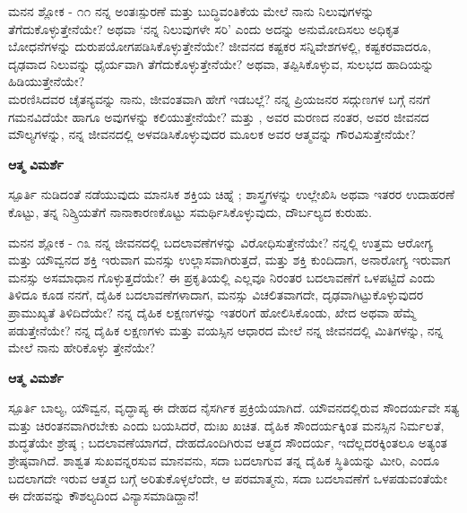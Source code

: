 \newpage
\begin{mananam}{\mananamfont ಮನನ ಶ್ಲೋಕ - ೧೧}
\footnotesize \mananamtext ನನ್ನ ಅಂತಃಸ್ಪುರಣೆ ಮತ್ತು ಬುದ್ಧಿವಂತಿಕೆಯ ಮೇಲೆ ನಾನು ನಿಲುವುಗಳನ್ನು ತೆಗೆದುಕೊಳ್ಳುತ್ತೇನೆಯೇ? ಅಥವಾ ‘ನನ್ನ ನಿಲುವುಗಳೇ ಸರಿ’ ಎಂದು ಅದನ್ನು ಅನುಮೋದಿಸಲು ಅಧಿಕೃತ ಬೋಧನೆಗಳನ್ನು ದುರುಪಯೋಗಪಡಿಸಿಕೊಳ್ಳುತ್ತೇನೆಯೇ? ಜೀವನದ ಕಷ್ಟಕರ ಸನ್ನಿವೇಶಗಳಲ್ಲಿ, ಕಷ್ಟಕರವಾದರೂ, ದೃಢವಾದ ನಿಲುವನ್ನು ಧೈರ್ಯವಾಗಿ ತೆಗೆದುಕೊಳ್ಳುತ್ತೇನೆಯೇ? ಅಥವಾ, ತಪ್ಪಿಸಿಕೊಳ್ಳುವ, ಸುಲಭದ ಹಾದಿಯನ್ನು ಹಿಡಿಯುತ್ತೇನೆಯೇ?\\
ಮರಣಿಸಿದವರ ಚೈತನ್ಯವನ್ನು ನಾನು, ಜೀವಂತವಾಗಿ ಹೇಗೆ ಇಡಬಲ್ಲೆ? ನನ್ನ ಪ್ರಿಯಜನರ ಸದ್ಗುಣಗಳ ಬಗ್ಗೆ ನನಗೆ ಗಮನವಿದೆಯೇ ಹಾಗೂ ಅವುಗಳನ್ನು ಕಲಿಯುತ್ತೇನೆಯೇ? ಮತ್ತು , ಅವರ ಮರಣದ ನಂತರ, ಅವರ ಜೀವನದ ಮೌಲ್ಯಗಳನ್ನು, ನನ್ನ ಜೀವನದಲ್ಲಿ ಅಳವಡಿಸಿಕೊಳ್ಳುವುದರ ಮೂಲಕ ಅವರ ಆತ್ಮವನ್ನು ಗೌರವಿಸುತ್ತೇನೆಯೇ?
\end{mananam}
\WritingHand\enspace\textbf{ಆತ್ಮ ವಿಮರ್ಶೆ}
\begin{inspiration}{\mananamfont ಸ್ಪೂರ್ತಿ}
\footnotesize \mananamtext ನುಡಿದಂತೆ ನಡೆಯುವುದು ಮಾನಸಿಕ ಶಕ್ತಿಯ ಚಿಹ್ನೆ ; ಶಾಸ್ತ್ರಗಳನ್ನು ಉಲ್ಲೇಖಿಸಿ ಅಥವಾ ಇತರರ ಉದಾಹರಣೆ ಕೊಟ್ಟು, ತನ್ನ ನಿಶ್ಕ್ರಿಯತೆಗೆ ನಾನಾಕಾರಣಕೊಟ್ಟು ಸಮರ್ಥಿಸಿಕೊಳ್ಳುವುದು, ದೌರ್ಬಲ್ಯದ ಕುರುಹು.
\end{inspiration}
\newpage

\begin{mananam}{\mananamfont ಮನನ ಶ್ಲೋಕ - ೧೩}
\footnotesize \mananamtext ನನ್ನ ಜೀವನದಲ್ಲಿ ಬದಲಾವಣೆಗಳನ್ನು ವಿರೋಧಿಸುತ್ತೇನೆಯೇ? ನನ್ನಲ್ಲಿ ಉತ್ತಮ ಆರೋಗ್ಯ ಮತ್ತು ಯೌವ್ವನದ ಶಕ್ತಿ ಇರುವಾಗ ಮನಸ್ಸು ಉಲ್ಲಾಸವಾಗಿರುತ್ತದೆ, ಮತ್ತು ಶಕ್ತಿ ಕುಂದಿದಾಗ, ಅನಾರೋಗ್ಯ ಇರುವಾಗ ಮನಸ್ಸು ಅಸಮಾಧಾನ ಗೊಳ್ಳುತ್ತದೆಯೇ? ಈ ಪ್ರಕೃತಿಯಲ್ಲಿ ಎಲ್ಲವೂ ನಿರಂತರ ಬದಲಾವಣೆಗೆ ಒಳಪಟ್ಟಿದೆ ಎಂದು ತಿಳಿದೂ ಕೂಡ ನನಗೆ, ದೈಹಿಕ ಬದಲಾವಣೆಗಳಾದಾಗ, ಮನಸ್ಸು ವಿಚಲಿತವಾಗದೇ, ದೃಢವಾಗಿಟ್ಟುಕೊಳ್ಳುವುದರ ಪ್ರಾಮುಖ್ಯತೆ ತಿಳಿದಿದೆಯೇ? ನನ್ನ ದೈಹಿಕ ಲಕ್ಷಣಗಳನ್ನು ಇತರರಿಗೆ ಹೋಲಿಸಿಕೊಂಡು, ಖೇದ ಅಥವಾ ಹೆಮ್ಮೆ ಪಡುತ್ತೇನೆಯೇ? ನನ್ನ ದೈಹಿಕ ಲಕ್ಷಣಗಳು ಮತ್ತು ವಯಸ್ಸಿನ ಆಧಾರದ ಮೇಲೆ ನನ್ನ ಜೀವನದಲ್ಲಿ ಮಿತಿಗಳನ್ನು, ನನ್ನ ಮೇಲೆ ನಾನು ಹೇರಿಕೊಳ್ಳು ತ್ತೇನೆಯೇ?
\end{mananam}
\WritingHand\enspace\textbf{ಆತ್ಮ ವಿಮರ್ಶೆ}
\begin{inspiration}{\mananamfont ಸ್ಪೂರ್ತಿ}
\footnotesize \mananamtext ಬಾಲ್ಯ, ಯೌವ್ವನ, ವೃದ್ಧಾಪ್ಯ ಈ ದೇಹದ ನೈಸರ್ಗಿಕ ಪ್ರಕ್ರಿಯೆಯಾಗಿದೆ. ಯೌವನದಲ್ಲಿರುವ ಸೌಂದರ್ಯವೇ ಸತ್ಯ ಮತ್ತು ಚಿರಂತನವಾಗಿರಬೇಕು ಎಂದು ಬಯಸಿದರೆ, ದುಃಖ ಖಚಿತ. ದೈಹಿಕ ಸೌಂದರ್ಯಕ್ಕಿಂತ ಮನಸ್ಸಿನ ನಿರ್ಮಲತೆ, ಶುದ್ಧತೆಯೇ ಶ್ರೇಷ್ಠ ; ಬದಲಾವಣೆಯಾಗದೆ, ದೇಹದೊಂದಿಗಿರುವ ಆತ್ಮದ ಸೌಂದರ್ಯ, ಇದೆಲ್ಲದರಕ್ಕಿಂತಲೂ  ಅತ್ಯಂತ ಶ್ರೇಷ್ಠವಾಗಿದೆ.
 ಶಾಶ್ವತ ಸುಖವನ್ನರಸುವ ಮಾನವನು,  ಸದಾ ಬದಲಾಗುವ ತನ್ನ ದೈಹಿಕ ಸ್ಥಿತಿಯನ್ನು ಮೀರಿ, ಎಂದೂ ಬದಲಾಗದೇ ಇರುವ ಆತ್ಮದ ಬಗ್ಗೆ ಅರಿತುಕೊಳ್ಳಲೆಂದೇ, ಆ ಪರಮಾತ್ಮನು,  ಸದಾ ಬದಲಾವಣೆಗೆ ಒಳಪಡುವಂತೆಯೇ ಈ ದೇಹವನ್ನು ಕೌಶಲ್ಯದಿಂದ ವಿನ್ಯಾಸಮಾಡಿದ್ದಾನೆ!
\end{inspiration}
\newpage

